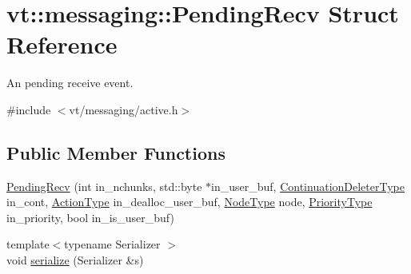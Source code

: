 \hypertarget{structvt_1_1messaging_1_1_pending_recv}{}\section{vt\+:\+:messaging\+:\+:Pending\+Recv Struct Reference}
\label{structvt_1_1messaging_1_1_pending_recv}


An pending receive event.  




{\ttfamily \#include $<$vt/messaging/active.\+h$>$}

\subsection*{Public Member Functions}
\begin{DoxyCompactItemize}
\item 
\hyperlink{structvt_1_1messaging_1_1_pending_recv_ada81b3367eca241184cfcf7e77aacacb}{Pending\+Recv} (int in\+\_\+nchunks, std\+::byte $\ast$in\+\_\+user\+\_\+buf, \hyperlink{namespacevt_a6de3bd201e2a040be9362d9d24d1e446}{Continuation\+Deleter\+Type} in\+\_\+cont, \hyperlink{namespacevt_ae0a5a7b18cc99d7b732cb4d44f46b0f3}{Action\+Type} in\+\_\+dealloc\+\_\+user\+\_\+buf, \hyperlink{namespacevt_a866da9d0efc19c0a1ce79e9e492f47e2}{Node\+Type} node, \hyperlink{namespacevt_a86bff9f556eb761b27fc8600d006ac04}{Priority\+Type} in\+\_\+priority, bool in\+\_\+is\+\_\+user\+\_\+buf)
\item 
{\footnotesize template$<$typename Serializer $>$ }\\void \hyperlink{structvt_1_1messaging_1_1_pending_recv_ac49714a19453135a9cc1f2d5a0b98af1}{serialize} (Serializer \&s)
\end{DoxyCompactItemize}
